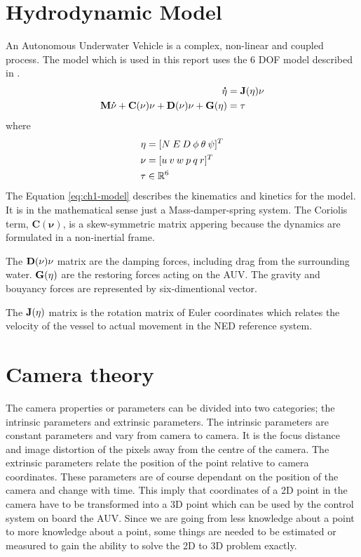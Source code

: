 \section{Hydrodynamic Model}
	\label{sec:ch1-model}
	An Autonomous Underwater Vehicle is a complex, non-linear and coupled process. The model which is used in this
	report uses the 6 DOF model described in \cite{fossen}.
	\begin{equation}
	\label{eq:ch1-model}
		\begin{aligned}
			\mathbf{\dot{\eta}} &= \mathbf{J}(\mathbf{\eta}) \mathbf{\nu} \\
			\mathbf{M}\mathbf{\dot{\nu}} + \mathbf{C}(\mathbf{\nu})\mathbf{\nu} + \mathbf{D}(\mathbf{\nu})\mathbf{\nu} + \mathbf{G}(\mathbf{\eta}) &= \mathbf{\tau} \\
		\end{aligned}
	\end{equation}
	where 
	\begin{align*}
		\mathbf{\eta} &= [N \: E \: D \: \phi \: \theta \: \psi ]^T \\
		\mathbf{\nu}  &= [u \: v \: w \: p \: q \: r]^T \\
		\mathbf{\tau} & \in \mathbb{R}^6
	\end{align*}
	The Equation \eqref{eq:ch1-model} describes the kinematics and kinetics for the model. It is in the 
	mathematical sense just a Mass-damper-spring system. The Coriolis term, $\mathbf{C}(\mathbf{\nu})$,
	is a skew-symmetric matrix appering because the dynamics are formulated in a non-inertial frame.

	The $\mathbf{D}(\mathbf{\nu})\mathbf{\nu}$ matrix are the damping forces, including drag from the surrounding water. $\mathbf{G}(\mathbf{\eta})$
	are the restoring forces acting on the AUV. The gravity and bouyancy forces are represented by
	six-dimentional vector.
	
	The $\mathbf{J}(\mathbf{\eta})$ matrix is the rotation matrix of Euler coordinates which relates the velocity of the 
	vessel to actual movement in the NED reference system.




\section{Camera theory}
	\label{ch1-cameramodel}
	The camera properties or parameters can be divided into two categories; the intrinsic parameters and
	extrinsic parameters. The intrinsic parameters are constant parameters and vary from camera to camera.
	It is the focus distance and image distortion of the pixels away from the centre of the camera. 
	The extrinsic parameters relate the position of the point relative to camera coordinates. 
	These parameters are of course dependant on the position of the camera and change with time. 	This imply that 
	coordinates of a 2D point in the camera have to be transformed into a 3D point which can be used 
	by the control system on board the AUV. Since 
	we are going from less knowledge about a point to more knowledge about a point, some things are needed to be 
	estimated or measured to gain the ability to solve the 2D to 3D problem exactly.\cite{robotbok}

